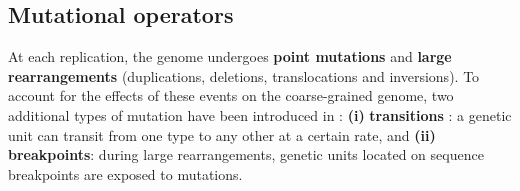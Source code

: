 
\subsection{Mutational operators}
\label{subsec:part2:methodology:mutational_operators}

At each replication, the genome undergoes \textbf{point mutations} and \textbf{large rearrangements} (duplications, deletions, translocations and inversions). To account for the effects of these events on the coarse-grained genome, two additional types of mutation have been introduced in {\EvoEvoSim}: \textbf{(i)} \textbf{transitions} : a genetic unit can transit from one type to any other at a certain rate, and \textbf{(ii)} \textbf{breakpoints}: during large rearrangements, genetic units located on sequence breakpoints are exposed to mutations.

